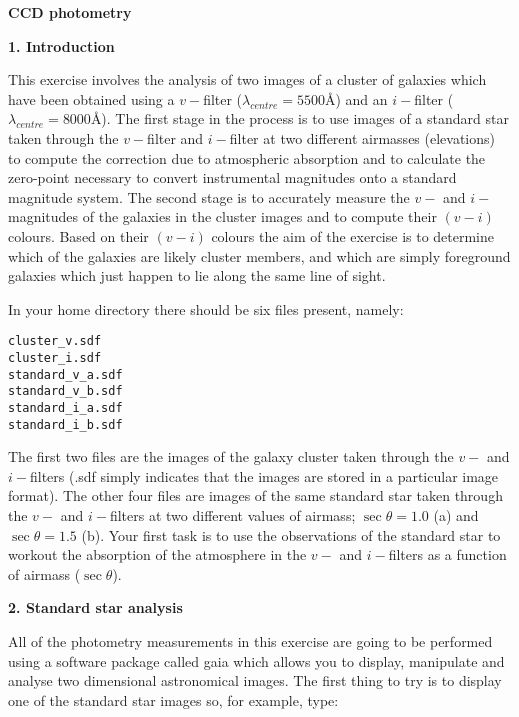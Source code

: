 \pagestyle{myheadings}
\setcounter{page}{1}

\begin{center}
{\Huge\bf CCD photometry}
\end{center}

{\bf \large{1. Introduction}}

This exercise involves the analysis of two images of a cluster of
galaxies which have been obtained using a
$v-$filter ($\lambda_{centre}=5500$\AA) and an $i-$filter ($\lambda_{centre}=8000$\AA). 
The first stage in the process is to use images of a standard star
taken through the $v-$filter and $i-$filter at two different airmasses
(elevations) to compute the correction due to atmospheric
absorption and to calculate the zero-point necessary to convert
instrumental magnitudes onto a standard magnitude system. The second stage is to accurately measure
the $v-$ and $i-$magnitudes of the galaxies in the cluster images and
to compute their $(v-i)$ colours. Based on their $(v-i)$
colours the aim of the exercise is to determine which of the
galaxies are likely cluster members, and which are simply
foreground galaxies which just happen to lie along the same line of sight.

\noindent
In your home directory there should be six files present, namely:

\verb,cluster_v.sdf,\\
\verb,cluster_i.sdf,\\
\verb,standard_v_a.sdf,\\
\verb,standard_v_b.sdf,\\
\verb,standard_i_a.sdf,\\
\verb,standard_i_b.sdf,

The first two files are the images of the galaxy cluster taken through
the $v-$ and $i-$filters (.sdf simply indicates that the images are stored in
a particular image format). The other four files are images of the
same standard star taken through the $v-$ and $i-$filters at two
different values of airmass; $\sec \theta=1.0$ (a) and $\sec \theta=1.5$ (b).
Your first task is to use the observations of the
standard star to workout the absorption of the atmosphere in the $v-$
and $i-$filters as a function of airmass ($\sec \theta$).

{\bf \large{2. Standard star analysis}}

All of the photometry measurements in this exercise are going to be
performed using a software package called {\sc gaia} which allows you 
to display, manipulate and analyse two dimensional astronomical images. The first thing to
try is to display one of the standard star images so, for example, type:

